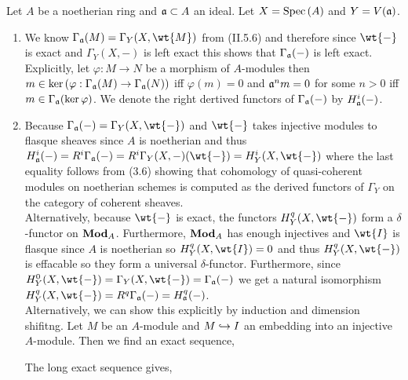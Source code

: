 \documentclass[12pt]{article}
\begin{document}
Let $A$ be a noetherian ring and $\mathfrak{a} \subset A$ an ideal. Let $X = \mathrm{Spec}\left( A \right)$ and $Y = V(\mathfrak{a})$.  

\begin{enumerate}
\item We know $\Gamma_\a(M) = \Gamma_Y(X, \wt{M})$ from (II.5.6) and therefore since $\wt{-}$ is exact and $\Gamma_Y(X, -)$ is left exact this shows that $\Gamma_{\mathfrak{a}}(-)$ is left exact. Explicitly, let $\varphi : M \to N$ be a morphism of $A$-modules then $m \in \ker{(\varphi : \Gamma_{\mathfrak{a}}(M) \to \Gamma_{\mathfrak{a}}(N))}$ iff $\varphi(m) = 0$ and $\mathfrak{a}^n m = 0$ for some $n > 0$ iff $m \in \Gamma_{\mathfrak{a}}(\ker{\varphi})$. We denote the right dertived functors of $\Gamma_{\mathfrak{a}}(-)$ by $H_{\mathfrak{a}}^i(-)$.

\item Because $\Gamma_\a(-) = \Gamma_Y(X, \wt{-})$ and $\wt{-}$ takes injective modules to flasque sheaves since $A$ is noetherian and thus $H_\a^i(-) = R^i \Gamma_\a(-) = R^i \Gamma_Y(X, -)(\wt{-}) = H_Y^i(X, \wt{-})$ where the last equality follows from (3.6) showing that cohomology of quasi-coherent modules on noetherian schemes is computed as the derived functors of $\Gamma_Y$ on the category of coherent sheaves. 
\bigskip\\
Alternatively, because $\wt{-}$ is exact, the functors $H^q_Y(X, \wt{-})$ form a $\delta$-functor on $\mathbf{Mod}_{A}$. Furthermore, $\mathbf{Mod}_{A}$ has enough injectives and $\wt{I}$ is flasque since $A$ is noetherian so $H^q_Y(X, \wt{I}) = 0$ and thus $H^q_Y(X, \wt{-})$ is effacable so they form a universal $\delta$-functor. Furthermore, since $H^0_Y(X, \wt{-}) = \Gamma_Y(X, \wt{-}) = \Gamma_\a(-)$ we get a natural isomorphism $H^q_Y(X, \wt{-}) = R^q \Gamma_\a(-) = H^q_\a(-)$.
\bigskip\\
Alternatively, we can show this explicitly by induction and dimension shifitng. Let $M$ be an $A$-module and $M \hookrightarrow I$ an embedding into an injective $A$-module. Then we find an exact sequence,
\begin{center}
\end{center}
The long exact sequence gives,
\begin{center}
\end{center}
\end{enumerate}
\end{document}
